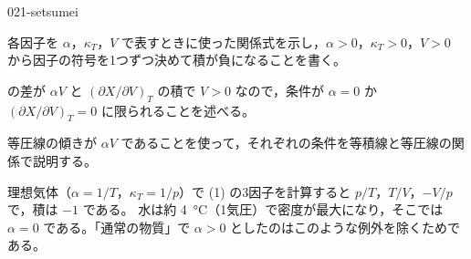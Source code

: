 \documentclass[uplatex,dvipdfmx,a4paper,11pt]{jsarticle}
\begin{document}
\begin{kaisetsu}{021-setsumei}
\begin{ronten}
  \item {} 各因子を $\alpha$，$\kappa_{T}$，$V$ で表すときに使った関係式を示し，$\alpha > 0$，$\kappa_{T} > 0$，$V > 0$ から因子の符号を1つずつ決めて積が負になることを書く。
  \item {}  の差が $\alpha V$ と $(\partial X/\partial V)_{T}$ の積で $V > 0$ なので，条件が $\alpha = 0$ か $(\partial X/\partial V)_{T} = 0$ に限られることを述べる。
  \item {} 等圧線の傾きが $\alpha V$ であることを使って，それぞれの条件を等積線と等圧線の関係で説明する。
\end{ronten}
\kenzan 理想気体（$\alpha = 1/T$，$\kappa_{T} = 1/p$）で (1) の3因子を計算すると $p/T$，$T/V$，$-V/p$ で，積は $-1$ である。
\tsumazuki 水は約 \qty{4}{\degreeCelsius}（1気圧）で密度が最大になり，そこでは $\alpha = 0$ である。「通常の物質」で $\alpha > 0$ としたのはこのような例外を除くためである。
\end{kaisetsu}
\end{document}

